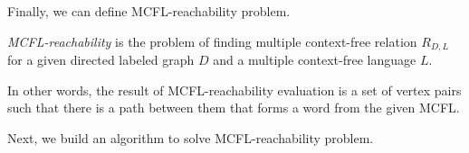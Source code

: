 Finally, we can define MCFL-reachability problem.
\begin{definition}
    \emph{MCFL-reachability} is the problem of finding multiple context-free relation $R_{D, L}$ for a given directed labeled graph $D$ and a multiple context-free language $L$.
\end{definition}

In other words, the result of MCFL-reachability evaluation is a set of vertex pairs such that there is a path between them that forms a word from the given MCFL.

Next, we build an algorithm to solve MCFL-reachability problem.